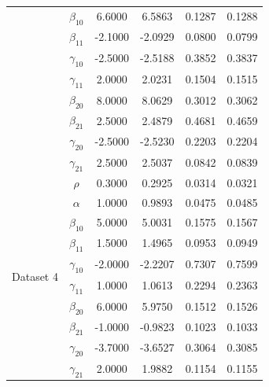 \begin{table}[H]
{\begin{tabular}{lccccc}
 & $\beta_{10}$ & 6.6000 & 6.5863 & 0.1287 & 0.1288\\
 & $\beta_{11}$ & -2.1000 & -2.0929 & 0.0800 & 0.0799\\
 & $\gamma_{10}$ & -2.5000 & -2.5188 & 0.3852 & 0.3837\\
 & $\gamma_{11}$ & 2.0000 & 2.0231 & 0.1504 & 0.1515\\
 & $\beta_{20}$ & 8.0000 & 8.0629 & 0.3012 & 0.3062\\
 & $\beta_{21}$ & 2.5000 & 2.4879 & 0.4681 & 0.4659\\
 & $\gamma_{20}$ & -2.5000 & -2.5230 & 0.2203 & 0.2204\\
 & $\gamma_{21}$ & 2.5000 & 2.5037 & 0.0842 & 0.0839\\
\midrule
\multirow{10}{*}{Dataset 4} & $\rho$ & 0.3000 & 0.2925 & 0.0314 & 0.0321\\
 & $\alpha$ & 1.0000 & 0.9893 & 0.0475 & 0.0485\\
 & $\beta_{10}$ & 5.0000 & 5.0031 & 0.1575 & 0.1567\\
 & $\beta_{11}$ & 1.5000 & 1.4965 & 0.0953 & 0.0949\\
 & $\gamma_{10}$ & -2.0000 & -2.2207 & 0.7307 & 0.7599\\
 & $\gamma_{11}$ & 1.0000 & 1.0613 & 0.2294 & 0.2363\\
 & $\beta_{20}$ & 6.0000 & 5.9750 & 0.1512 & 0.1526\\
 & $\beta_{21}$ & -1.0000 & -0.9823 & 0.1023 & 0.1033\\
 & $\gamma_{20}$ & -3.7000 & -3.6527 & 0.3064 & 0.3085\\
 & $\gamma_{21}$ & 2.0000 & 1.9882 & 0.1154 & 0.1155\\
\bottomrule
\end{tabular}
}
    \label{tab:sim_more}
\end{table}
